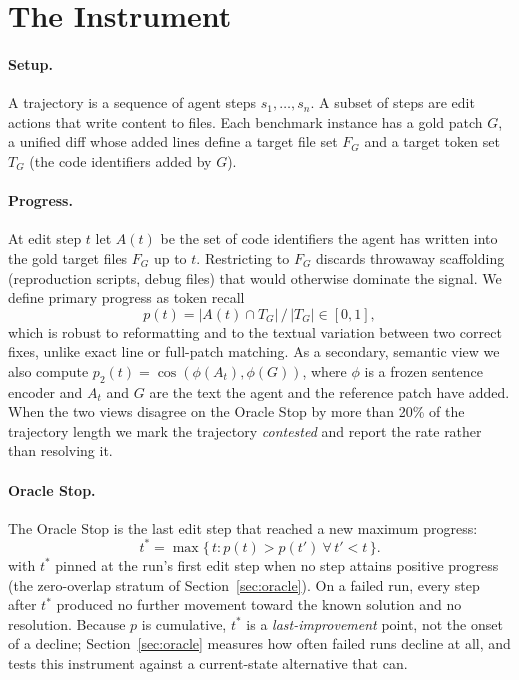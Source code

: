 \documentclass[sigconf,screen]{acmart}
\begin{document}
\section{The Instrument}
\paragraph{Setup.} A trajectory is a sequence of agent steps $s_1,\dots,s_n$. A subset of steps are
edit actions that write content to files. Each benchmark instance has a gold patch $G$, a unified
diff whose added lines define a target file set $F_G$ and a target token set $T_G$ (the code
identifiers added by $G$).

\paragraph{Progress.} At edit step $t$ let $A(t)$ be the set of code identifiers the agent has
written into the gold target files $F_G$ up to $t$. Restricting to $F_G$ discards throwaway
scaffolding (reproduction scripts, debug files) that would otherwise dominate the signal. We define
primary progress as token recall
\begin{equation}
p(t) = |A(t) \cap T_G| \,/\, |T_G| \in [0,1],
\end{equation}
which is robust to reformatting and to the textual variation between two correct fixes, unlike
exact line or full-patch matching. As a secondary, semantic view we also compute
$p_2(t)=\cos(\phi(A_t),\phi(G))$, where $\phi$ is a frozen sentence encoder
\cite{reimers2019sentencebert} and $A_t$ and $G$ are the text the agent and the reference patch have
added. When the two views disagree on the Oracle Stop by more than
20\% of the trajectory length we mark the trajectory \emph{contested} and report the rate rather
than resolving it.

\paragraph{Oracle Stop.} The Oracle Stop is the last edit step that reached a new maximum progress:
\begin{equation}
t^{*} = \max\{\, t : p(t) > p(t') \ \forall\, t' < t \,\}.
\end{equation}
with $t^{*}$ pinned at the run's first edit step when no step attains positive progress (the
zero-overlap stratum of Section~\ref{sec:oracle}). On a failed run, every step after $t^{*}$ produced no further movement
toward the known solution and no resolution. Because $p$ is cumulative, $t^{*}$ is a \emph{last-improvement} point, not the
onset of a decline; Section~\ref{sec:oracle} measures how often failed runs decline at all, and
tests this instrument against a current-state alternative that can.
\end{document}
